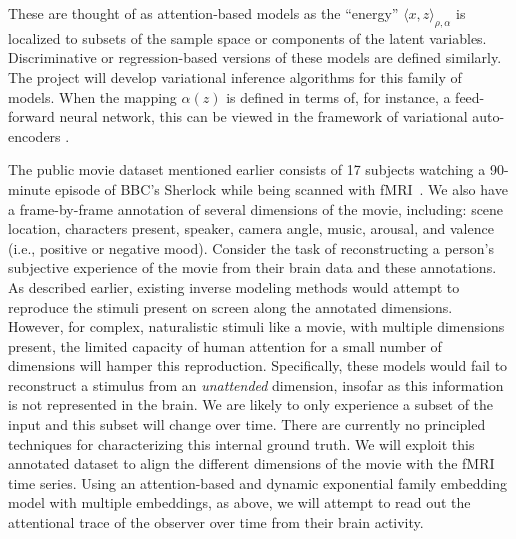 These are thought of as attention-based models as the ``energy''
$\langle x, z\rangle_{\rho,\alpha}$ is localized to subsets of the
sample space or components of the latent variables. Discriminative or regression-based versions of these
models are defined similarly. The project will develop variational
inference algorithms for this family of models. When the mapping 
$\alpha(z)$ is defined in terms of, for instance, a feed-forward
neural network, this can be viewed in the framework of variational auto-encoders
\citep{kingma13}.

The public movie dataset mentioned earlier consists of 17 subjects
watching a 90-minute episode of BBC's Sherlock while being scanned with
fMRI~\citep{chen17,baldassano17}. We also have a frame-by-frame
annotation of several dimensions of the movie, including: scene
location, characters present, speaker, camera angle, music, arousal, and
valence (i.e., positive or negative mood). Consider the task of
reconstructing a person's subjective experience of the movie from their
brain data and these annotations. As described earlier, existing inverse modeling
methods would attempt to reproduce the stimuli present on screen along the
annotated dimensions. However, for complex, naturalistic stimuli like a movie,
with multiple dimensions present, the limited capacity of human attention for a small
number of dimensions will hamper this reproduction. Specifically, these models
would fail to reconstruct a stimulus from an \textit{unattended} dimension,
insofar as this information is not represented in the brain. 
We are likely to only experience a subset of the input and this subset will
change over time. There are currently no principled
techniques for characterizing this internal ground truth. We will
exploit this annotated dataset to align the different dimensions of the
movie with the fMRI time series. Using an attention-based and dynamic
exponential family embedding model with multiple embeddings, as above, we will
attempt to read out the attentional trace of the observer over time from their brain activity.


